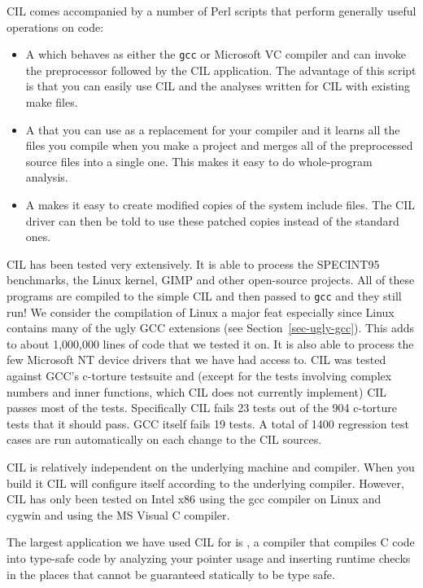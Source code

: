 \documentclass{article}
\def\secref#1{Section~\ref{sec-#1}}
\def\t#1{{\tt #1}}
\begin{document}
 CIL comes accompanied by a number of Perl scripts that perform generally
useful operations on code:
\begin{itemize}
\item A  which behaves as either the \t{gcc} or
Microsoft VC compiler and can invoke the preprocessor followed by the CIL
application. The advantage of this script is that you can easily use CIL and
the analyses written for CIL with existing make files.
\item A  that you can use as a
replacement for your compiler and it learns all the files you compile when you
make a project and merges all of the preprocessed source files into a single
one. This makes it easy to do whole-program analysis.
\item A  makes it easy to create modified
copies of the system include files. The CIL driver can then be told to use
these patched copies instead of the standard ones.
\end{itemize}

 CIL has been tested very extensively. It is able to process the SPECINT95
benchmarks, the Linux kernel, GIMP and other open-source projects. All of
these programs are compiled to the simple CIL and then passed to \t{gcc} and
they still run! We consider the compilation of Linux a major feat especially
since Linux contains many of the ugly GCC extensions (see \secref{ugly-gcc}).
This adds to about 1,000,000 lines of code that we tested it on. It is also
able to process the few Microsoft NT device drivers that we have had access
to. CIL was tested against GCC's c-torture testsuite and (except for the tests
involving complex numbers and inner functions, which CIL does not currently
implement) CIL passes most of the tests. Specifically CIL fails 23 tests out
of the 904 c-torture tests that it should pass. GCC itself fails 19 tests. A
total of 1400 regression test cases are run automatically on each change to
the CIL sources.

 CIL is relatively independent on the underlying machine and compiler. When
you build it CIL will configure itself according to the underlying compiler.
However, CIL has only been tested on Intel x86 using the gcc compiler on Linux
and cygwin and using the MS Visual C compiler. 

 The largest application we have used CIL for is
, a compiler that compiles C code into
type-safe code by analyzing your pointer usage and inserting runtime checks in
the places that cannot be guaranteed statically to be type safe.  
\end{document}
